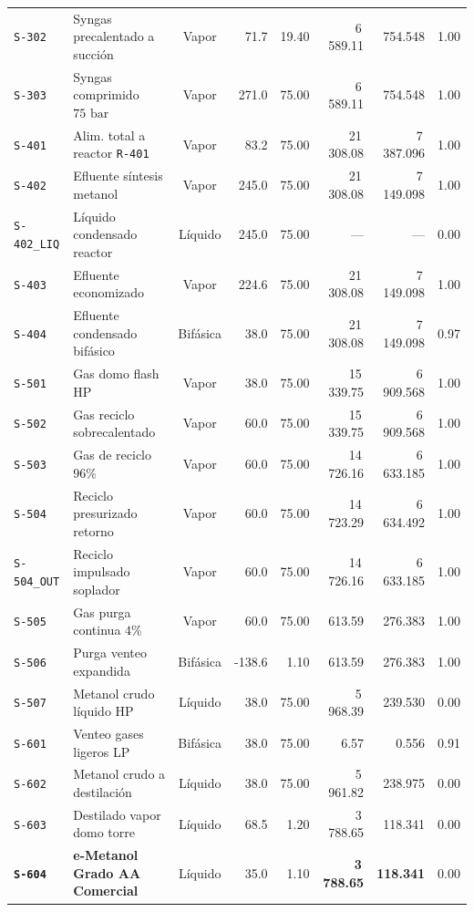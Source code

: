 \documentclass[11pt,letterpaper]{article}
\begin{document}
\begin{landscape}
\begin{center}
\begin{tabularx}{\textwidth}{lXcrrrrc}
\texttt{S-302} & Syngas precalentado a succión & Vapor & 71.7 & 19.40 & 6\,589.11 & 754.548 & 1.00 \\
\texttt{S-303} & Syngas comprimido $75\text{ bar}$ & Vapor & 271.0 & 75.00 & 6\,589.11 & 754.548 & 1.00 \\
\texttt{S-401} & Alim. total a reactor \texttt{R-401} & Vapor & 83.2 & 75.00 & 21\,308.08 & 7\,387.096 & 1.00 \\
\texttt{S-402} & Efluente síntesis metanol & Vapor & 245.0 & 75.00 & 21\,308.08 & 7\,149.098 & 1.00 \\
\texttt{S-402\_LIQ} & Líquido condensado reactor & Líquido & 245.0 & 75.00 & --- & --- & 0.00 \\
\texttt{S-403} & Efluente economizado & Vapor & 224.6 & 75.00 & 21\,308.08 & 7\,149.098 & 1.00 \\
\texttt{S-404} & Efluente condensado bifásico & Bifásica & 38.0 & 75.00 & 21\,308.08 & 7\,149.098 & 0.97 \\
\texttt{S-501} & Gas domo flash HP & Vapor & 38.0 & 75.00 & 15\,339.75 & 6\,909.568 & 1.00 \\
\texttt{S-502} & Gas reciclo sobrecalentado & Vapor & 60.0 & 75.00 & 15\,339.75 & 6\,909.568 & 1.00 \\
\texttt{S-503} & Gas de reciclo $96\%$ & Vapor & 60.0 & 75.00 & 14\,726.16 & 6\,633.185 & 1.00 \\
\texttt{S-504} & Reciclo presurizado retorno & Vapor & 60.0 & 75.00 & 14\,723.29 & 6\,634.492 & 1.00 \\
\texttt{S-504\_OUT} & Reciclo impulsado soplador & Vapor & 60.0 & 75.00 & 14\,726.16 & 6\,633.185 & 1.00 \\
\texttt{S-505} & Gas purga continua $4\%$ & Vapor & 60.0 & 75.00 & 613.59 & 276.383 & 1.00 \\
\texttt{S-506} & Purga venteo expandida & Bifásica & -138.6 & 1.10 & 613.59 & 276.383 & 1.00 \\
\texttt{S-507} & Metanol crudo líquido HP & Líquido & 38.0 & 75.00 & 5\,968.39 & 239.530 & 0.00 \\
\texttt{S-601} & Venteo gases ligeros LP & Bifásica & 38.0 & 75.00 & 6.57 & 0.556 & 0.91 \\
\texttt{S-602} & Metanol crudo a destilación & Líquido & 38.0 & 75.00 & 5\,961.82 & 238.975 & 0.00 \\
\texttt{S-603} & Destilado vapor domo torre & Líquido & 68.5 & 1.20 & 3\,788.65 & 118.341 & 0.00 \\
\textbf{\texttt{S-604}} & \textbf{e-Metanol Grado AA Comercial} & Líquido & 35.0 & 1.10 & \textbf{3\,788.65} & \textbf{118.341} & 0.00 \\

\end{tabularx}
\end{center}
\end{landscape}
\end{document}
